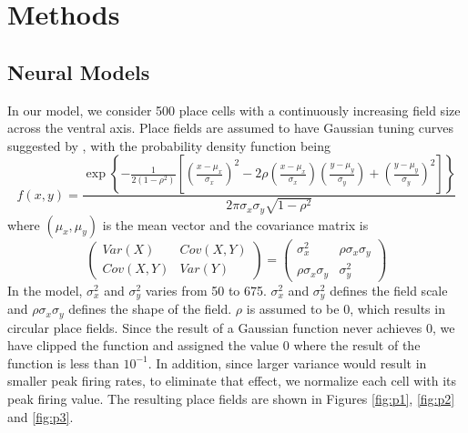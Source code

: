 \documentclass[11pt, letterpaper, onecolumn]{article}
\begin{document}
\section{Methods}

\subsection{Neural Models}
In our model, we consider 500 place cells with a continuously increasing field size across the ventral axis. Place fields are assumed to have Gaussian tuning curves suggested by \cite{OKeefe:Geometric96}, with the probability density function being
\begin{equation}
\label{eq:placeprob}
f(x,y)=\frac{\exp \left\{ -\frac 1{2(1-\rho ^2)}\left[ \left( \frac{x-\mu _x%
}{\sigma _x}\right) ^2-2\rho \left( \frac{x-\mu _x}{\sigma _x}\right) \left( 
\frac{y-\mu _y}{\sigma _y}\right) +\left( \frac{y-\mu _y}{\sigma _y}\right)
^2\right] \right\} }{2\pi \sigma _x\sigma _y\sqrt{1-\rho ^2}} 
\end{equation}
where $(\mu _x,\mu _y)$ is the mean vector and the covariance matrix is
\begin{equation}
\left( 
\begin{array}{cc}
Var(X) & Cov(X,Y) \\ 
Cov(X,Y) & Var(Y)
\end{array}
\right) =\left( 
\begin{array}{cc}
\sigma _x^2 & \rho \sigma _x\sigma _y \\ 
\rho \sigma _x\sigma _y & \sigma _y^2
\end{array}
\right) 
\end{equation}
In the model, $ \sigma _x^2 $ and $ \sigma _y^2 $ varies from 50 to 675. $ \sigma _x^2 $ and $ \sigma _y^2 $ defines the field scale and $ \rho \sigma _x\sigma _y $ defines the shape of the field. $ \rho $ is assumed to be 0, which results in circular place fields. Since the result of a Gaussian function never achieves 0, we have clipped the function and assigned the value 0 where the result of the function is less than $ 10^{-1} $. In addition, since larger variance would result in smaller peak firing rates, to eliminate that effect, we normalize each cell with its peak firing value. The resulting place fields are shown in Figures \ref{fig:p1}, \ref{fig:p2} and \ref{fig:p3}.
\end{document}
